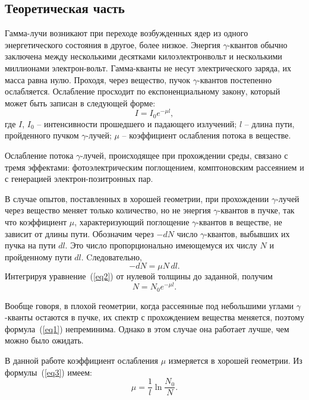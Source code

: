 \documentclass[a4paper, 12pt]{article}%
\begin{document}
\subsection{Теоретическая часть}
	Гамма-лучи возникают при переходе возбужденных ядер из одного энергетического состояния в другое, более низкое. Энергия $\gamma$-квантов обычно заключена между несколькими десятками килоэлектронвольт и несколькими миллионами электрон-вольт. Гамма-кванты не несут электрического заряда, их масса равна нулю. Проходя, через вещество, пучок $\gamma$-квантов постепенно ослабляется. Ослабление просходит по експоненциальному закону, который может быть записан в следующей форме:
	\begin{equation}
		\label{eq1}
		I = I_0 e^{-\mu l},
	\end{equation}
	где $I$, $I_0$ -- интенсивности прошедшего и падающего излучений; $l$ -- длина пути, пройденного пучком $\gamma$-лучей; $\mu$ -- коэффициент ослабления потока в веществе.
	
	Ослабление потока $\gamma$-лучей, происходящее при прохождении среды, связано с тремя эффектами: фотоэлектрическим поглощением, комптоновским рассеянием и с генерацией электрон-позитронных пар.
	
	В случае опытов, поставленных в хорошей геометрии, при прохождении $\gamma$-лучей через вещество меняет только количество, но не энергия $\gamma$-квантов в пучке, так что коэффициент $\mu$, характеризующий поглощение $\gamma$-квантов в веществе, не зависит от длины пути. Обозначим через $-dN$ число $\gamma$-квантов, выбывших их пучка на пути $dl$. Это число пропорционально имеющемуся их числу $N$ и пройденному пути $dl$. Cледовательно,
	\begin{equation}
		\label{eq2}
		-dN = \mu N \, dl.
	\end{equation} 
	Интегрируя уравнение~(\ref{eq2}) от нулевой толщины до заданной, получим
	\begin{equation}
		\label{eq3}
		N = N_0 e^{-\mu l}.
	\end{equation}

	Вообще говоря, в плохой геометрии, когда рассеянные под небольшими углами $\gamma$-кванты остаются в пучке, их спектр с прохождением вещества меняется, поэтому формула~(\ref{eq1}) непреминима. Однако в этом случае она работает лучше, чем можно было ожидать.
	
	В данной работе коэффициент ослабления $\mu$ измеряется в хорошей геометрии. Из формулы~(\ref{eq3}) имеем:
	\begin{equation}
		\tag{$\star$}
		\label{formula}
		\mu = \frac{1}{l} \ln \frac{N_0}{N}.
	\end{equation}
\end{document}
